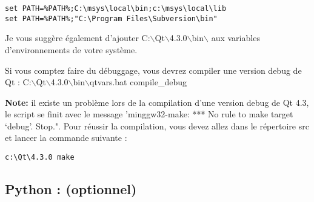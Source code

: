 \begin{verbatim}
set PATH=%PATH%;C:\msys\local\bin;c:\msys\local\lib 
set PATH=%PATH%;"C:\Program Files\Subversion\bin" 
\end{verbatim}

Je vous sugg\`ere \'egalement d'ajouter
C:$\backslash$Qt$\backslash$4.3.0$\backslash$bin$\backslash$ aux variables
d'environnements de votre syst\`eme.

Si vous comptez faire du d\'ebuggage, vous devrez compiler une version debug de Qt
:
C:$\backslash$Qt$\backslash$4.3.0$\backslash$bin$\backslash$qtvars.bat
compile\_debug

\textbf{Note:} il existe un probl\`eme lors de la compilation d'une version debug
de Qt 4.3, le script se finit avec le message 'minggw32-make: *** No rule to make target `debug'. Stop.".
Pour r\'eussir la compilation, vous devez allez dans le r\'epertoire src et lancer la commande suivante :

\begin{verbatim}
c:\Qt\4.3.0 make 
\end{verbatim}


 \subsection{Python : (optionnel)}

%
%
%

